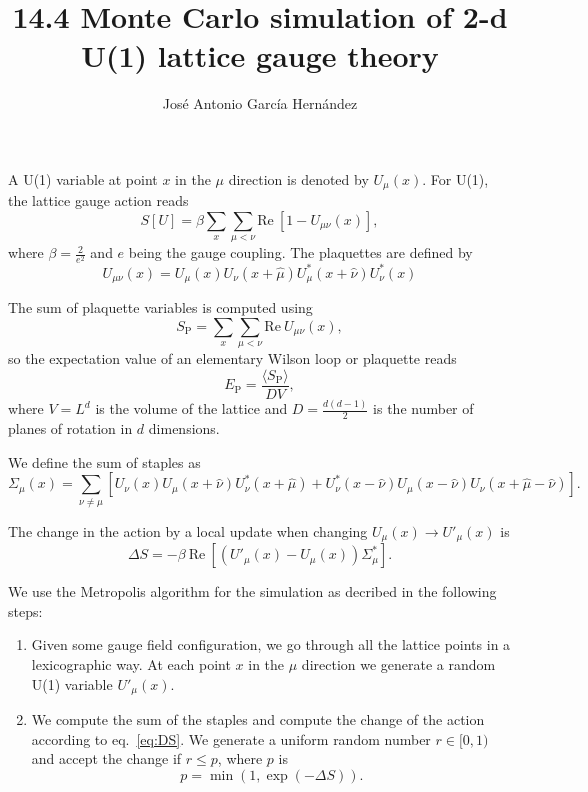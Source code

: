 \documentclass[12pt,a4paper]{article}
\author{José Antonio García Hernández}
\title{14.4 Monte Carlo simulation of 2-d U(1) lattice gauge theory}
\begin{document}
\maketitle

A U(1) variable at point $x$ in the $\mu$ direction is denoted by $U_{\mu}(x)$. For U(1), the lattice gauge action reads
\begin{equation}
	\label{eq:wilson_action}
	S[U] = \beta\sum_x \sum_{\mu < \nu} \text{Re}\  \left[1 - U_{\mu\nu}(x) \right],
\end{equation}
where $\beta = \frac{2}{e^2}$ and $e$ being the gauge coupling. The plaquettes are defined by
\begin{equation}
	\label{eq:plaquette}
	U_{\mu\nu}(x) = U_{\mu}(x)U_{\nu}(x+\hat{\mu})U_{\mu}^{*}(x+\hat{\nu})U_{\nu}^{*}(x) 
\end{equation}

The sum of plaquette variables is computed using 
\begin{equation}
	\label{eq:Sp}
	S_{\text{P}} =  \sum_x\sum_{\mu < \nu} \text{Re}\ U_{\mu\nu}(x),
\end{equation}
so the expectation value of an elementary Wilson loop or plaquette reads
\begin{equation}
	\label{eq:Ep}
	E_{\text{P}} =\frac{ \langle S_{\text{P}} \rangle}{D V},
\end{equation}
where $V=L^d$ is the volume of the lattice and $D = \frac{d(d-1)}{2}$ is the number of planes of rotation in $d$ dimensions.

We define the sum of staples as
\begin{equation}
	\label{eq:staples}
	\Sigma_{\mu}(x) = \sum_{\nu \neq \mu} \left[ U_{\nu}(x)U_{\mu}(x+\hat{\nu})U_{\nu}^{*}(x+\hat{\mu}) + U_{\nu}^{*}(x-\hat{\nu})U_{\mu}(x-\hat{\nu})U_{\nu}(x+\hat{\mu}-\hat{\nu})\right] .
\end{equation}


The change in the action  by a local update when changing $U_{\mu}(x) \to U'_{\mu}(x)$ is
\begin{equation}
	\label{eq:DS}
	\Delta S = -\beta \ \text{Re}\ \left[ \left( U'_{\mu}(x) - U_{\mu}(x) \right)\Sigma_{\mu}^{*}\right].
\end{equation}

We use the Metropolis algorithm for the simulation as decribed in the following steps:
\begin{enumerate}
	\item Given some gauge field configuration, we go through all the lattice points in a lexicographic way. At each point $x$ in the $\mu$ direction we generate a random U(1) variable $U'_{\mu}(x)$.
	
	\item We compute the sum of the staples and compute the change of the action according to eq.\ \eqref{eq:DS}. We generate a uniform random number $r\in [0,1)$ and accept the change if $r \leq p$, where $p$ is
	\begin{equation}
		p = \min (1, \exp(-\Delta S)).
\end{equation}	 
\end{enumerate}
\end{document}
